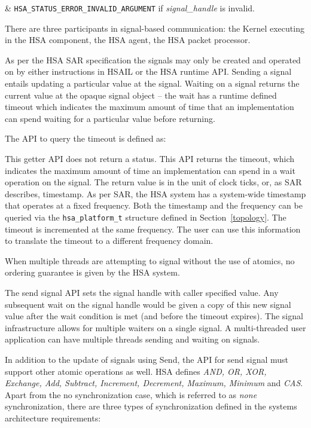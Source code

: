 \begin{easylist}
& \texttt{HSA\_STATUS\_ERROR\_INVALID\_ARGUMENT} if {\itshape
signal\_handle} is invalid.
\end{easylist}

There are three participants in signal-\/based communication: the
Kernel executing in the H\-S\-A component, the H\-S\-A agent, the
HSA packet processor. 

As per the HSA SAR specification the signals may only be created and
operated on by either instructions in HSAIL or the HSA runtime API.
Sending a signal entails updating a particular value at the signal.
Waiting on a signal returns the current value at the opaque signal
object -- the wait has a runtime defined timeout which indicates the
maximum amount of time that an implementation can spend waiting for
a particular value before returning. 

The API to query the timeout is defined as:



This getter API does not return a status.  This API returns the
timeout, which indicates the maximum amount of time an
implementation can spend in a wait operation on the signal. The
return value is in the unit of clock ticks, or, as SAR describes,
timestamp. As per SAR, the HSA system has a system-wide timestamp
that operates at a fixed frequency. Both the timestamp and the
frequency can be queried via the \texttt{hsa\_platform\_t} structure
defined in Section~\ref{topology}. The timeout is incremented at the
same frequency.  The user can use this information to translate the
timeout to a different frequency domain. 

When multiple threads are attempting to signal without the use of
atomics, no ordering guarantee is given by the HSA system. 

The send signal API sets the signal handle with caller specified
value. Any subsequent wait on the signal handle would be given 
a copy of this new signal value after the wait condition 
is met (and before the timeout expires).  The signal infrastructure
allows for multiple waiters on a single signal. A multi-threaded
user application can have multiple threads sending and waiting on
signals. 

In addition to the update of signals using
Send, the API for send signal must support other atomic operations as
well. HSA defines \emph {AND, OR, XOR, Exchange, Add, Subtract,
Increment, Decrement, Maximum, Minimum} and \emph{CAS}. Apart from
the no synchronization case, which is referred to as \emph{none}
synchronization, there are three types of synchronization defined in
the systems architecture requirements: 

